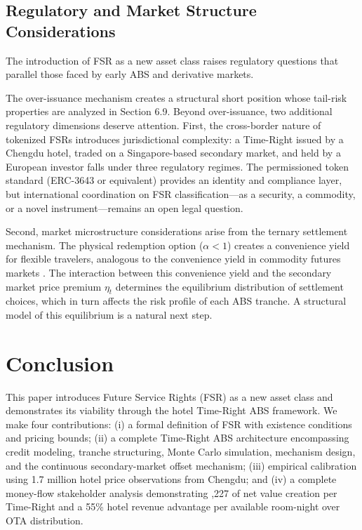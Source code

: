 \documentclass[12pt,a4paper]{article}
\begin{document}
\subsection{Regulatory and Market Structure Considerations}

The introduction of FSR as a new asset class raises regulatory questions that parallel those faced by early ABS and derivative markets.

The over-issuance mechanism creates a structural short position whose tail-risk properties are analyzed in Section 6.9.
Beyond over-issuance, two additional regulatory dimensions deserve attention.
First, the cross-border nature of tokenized FSRs introduces jurisdictional complexity: a Time-Right issued by a Chengdu hotel, traded on a Singapore-based secondary market, and held by a European investor falls under three regulatory regimes.
The permissioned token standard (ERC-3643 or equivalent) provides an identity and compliance layer, but international coordination on FSR classification---as a security, a commodity, or a novel instrument---remains an open legal question.

Second, market microstructure considerations arise from the ternary settlement mechanism.
The physical redemption option ($\alpha < 1$) creates a convenience yield for flexible travelers, analogous to the convenience yield in commodity futures markets \cite{brennan1985}.
The interaction between this convenience yield and the secondary market price premium $\eta_t$ determines the equilibrium distribution of settlement choices, which in turn affects the risk profile of each ABS tranche.
A structural model of this equilibrium is a natural next step.

\section{Conclusion}

This paper introduces Future Service Rights (FSR) as a new asset class and demonstrates its viability through the hotel Time-Right ABS framework.
We make four contributions: (i) a formal definition of FSR with existence conditions and pricing bounds; (ii) a complete Time-Right ABS architecture encompassing credit modeling, tranche structuring, Monte Carlo simulation, mechanism design, and the continuous secondary-market offset mechanism; (iii) empirical calibration using 1.7 million hotel price observations from Chengdu; and (iv) a complete money-flow stakeholder analysis demonstrating ,227 of net value creation per Time-Right and a 55\% hotel revenue advantage per available room-night over OTA distribution.
\end{document}
